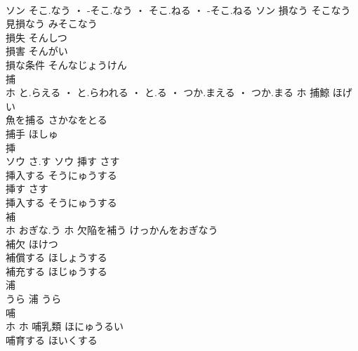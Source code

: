 \documentclass[8pt]{extreport}
\begin{document}
\begin{CJK}{UTF8}{min}
\\	ソン	そこ.なう ・ -そこ.なう ・ そこ.ねる ・ -そこ.ねる	ソン	損なう	そこなう	
\\	見損なう	みそこなう	
\\	損失	そんしつ	
\\	損害	そんがい	
\\	損な条件	そんなじょうけん	
\\	捕	
\\	ホ	と.らえる ・ と.らわれる ・ と.る ・ つか.まえる ・ つか.まる	ホ	捕鯨	ほげい	
\\	魚を捕る	さかなをとる	
\\	捕手	ほしゅ	
\\	挿	
\\	ソウ	さ.す	ソウ	挿す	さす	
\\	挿入する	そうにゅうする	
\\	挿す	さす	
\\	挿入する	そうにゅうする	
\\	補	
\\	ホ	おぎな.う	ホ	欠陥を補う	けっかんをおぎなう	
\\	補欠	ほけつ	
\\	補償する	ほしょうする	
\\	補充する	ほじゅうする	
\\	浦	
\\	うら														浦	うら	
\\	哺	
\\	ホ		ホ	哺乳類	ほにゅうるい	
\\	哺育する	ほいくする	
\end{CJK}
\end{document}
